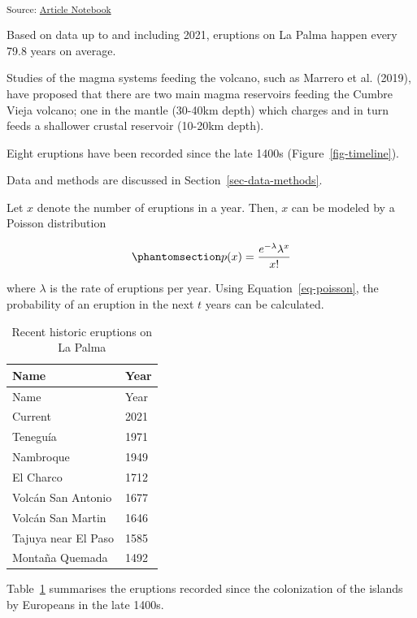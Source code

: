 \documentclass[
]{agujournal2019}
\begin{document}
\textsubscript{Source:
\href{https://Daniel-PerezPerez.github.io/manuscript-tutorial/index.qmd.html}{Article
Notebook}}

Based on data up to and including 2021, eruptions on La Palma happen
every 79.8 years on average.

Studies of the magma systems feeding the volcano, such as Marrero et al.
(2019), have proposed that there are two main magma reservoirs feeding
the Cumbre Vieja volcano; one in the mantle (30-40km depth) which
charges and in turn feeds a shallower crustal reservoir (10-20km depth).

Eight eruptions have been recorded since the late 1400s
(Figure~\ref{fig-timeline}).

Data and methods are discussed in Section~\ref{sec-data-methods}.

Let \(x\) denote the number of eruptions in a year. Then, \(x\) can be
modeled by a Poisson distribution

\begin{equation}\protect\phantomsection\label{eq-poisson}{
p(x) = \frac{e^{-\lambda} \lambda^{x}}{x !}
}\end{equation}

where \(\lambda\) is the rate of eruptions per year. Using
Equation~\ref{eq-poisson}, the probability of an eruption in the next
\(t\) years can be calculated.

\begin{longtable}[]{@{}ll@{}}
\caption{Recent historic eruptions on La
Palma}\label{tbl-history}\tabularnewline
\toprule\noalign{}
Name & Year \\
\midrule\noalign{}
\endfirsthead
\toprule\noalign{}
Name & Year \\
\midrule\noalign{}
\endhead
\bottomrule\noalign{}
\endlastfoot
Current & 2021 \\
Teneguía & 1971 \\
Nambroque & 1949 \\
El Charco & 1712 \\
Volcán San Antonio & 1677 \\
Volcán San Martin & 1646 \\
Tajuya near El Paso & 1585 \\
Montaña Quemada & 1492 \\
\end{longtable}

Table~\ref{tbl-history} summarises the eruptions recorded since the
colonization of the islands by Europeans in the late 1400s.
\end{document}
